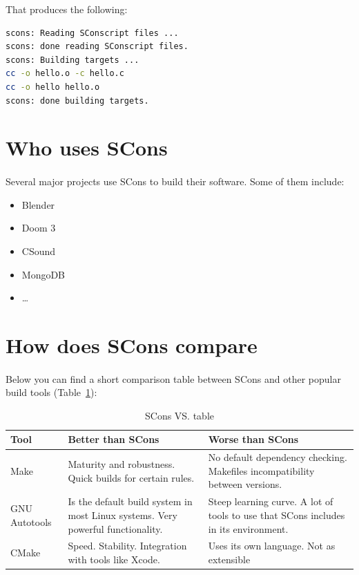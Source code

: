 \documentclass[a4paper,11pt]{report}
\begin{document}
That produces the following:

\begin{lstlisting}[language=bash, columns=fullflexible]
% scons
scons: Reading SConscript files ...
scons: done reading SConscript files.
scons: Building targets ...
cc -o hello.o -c hello.c
cc -o hello hello.o
scons: done building targets.
\end{lstlisting}

\section{Who uses SCons}

\paragraph{}


Several major projects use SCons to build their software. Some of them include:

\begin{itemize}
\item{Blender}
\item{Doom 3}
\item{CSound}
\item{MongoDB}
\item{\ldots}
\end{itemize}
\newpage
\section{How does SCons compare}

\paragraph{}

Below you can find a short comparison table between SCons and other popular build tools (Table~\ref{tab:scons}):

\begin{table}[h]
\centering
 \begin{tabular}{| l | p{6 cm} | p{6 cm} |}
 \hline \textbf{Tool} & \textbf{Better than SCons} & \textbf{Worse than SCons} \\
 \hline 
 Make & Maturity and robustness. Quick builds for certain rules. & No default dependency checking. Makefiles incompatibility between versions.\\
 \hline 
 GNU Autotools& Is the default build system in most Linux systems. Very powerful functionality. & Steep learning curve. A lot of tools to use that SCons includes in its environment. \\ 
 \hline 
 CMake & Speed. Stability. Integration with tools like Xcode. & Uses its own language. Not as extensible\\ 
 \hline 
 \end{tabular} 
 \caption[SCons VS. table]{SCons VS. table}
 \label{tab:scons}
\end{table}
\end{document}
